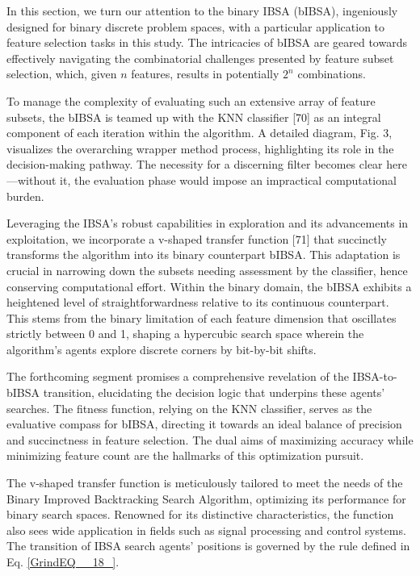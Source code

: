 \documentclass{article} %
\begin{document}
In this section, we turn our attention to the binary IBSA (bIBSA), ingeniously designed for binary discrete problem spaces, with a particular application to feature selection tasks in this study. The intricacies of bIBSA are geared towards effectively navigating the combinatorial challenges presented by feature subset selection, which, given $n$ features, results in potentially $2^n$ combinations.

To manage the complexity of evaluating such an extensive array of feature subsets, the bIBSA is teamed up with the KNN classifier [70] as an integral component of each iteration within the algorithm. A detailed diagram, Fig. 3, visualizes the overarching wrapper method process, highlighting its role in the decision-making pathway. The necessity for a discerning filter becomes clear here---without it, the evaluation phase would impose an impractical computational burden.

Leveraging the IBSA's robust capabilities in exploration and its advancements in exploitation, we incorporate a v-shaped transfer function [71] that succinctly transforms the algorithm into its binary counterpart bIBSA. This adaptation is crucial in narrowing down the subsets needing assessment by the classifier, hence conserving computational effort. Within the binary domain, the bIBSA exhibits a heightened level of straightforwardness relative to its continuous counterpart. This stems from the binary limitation of each feature dimension that oscillates strictly between 0 and 1, shaping a hypercubic search space wherein the algorithm's agents explore discrete corners by bit-by-bit shifts.

The forthcoming segment promises a comprehensive revelation of the IBSA-to-bIBSA transition, elucidating the decision logic that underpins these agents' searches. The fitness function, relying on the KNN classifier, serves as the evaluative compass for bIBSA, directing it towards an ideal balance of precision and succinctness in feature selection. The dual aims of maximizing accuracy while minimizing feature count are the hallmarks of this optimization pursuit.

The v-shaped transfer function is meticulously tailored to meet the needs of the Binary Improved Backtracking Search Algorithm, optimizing its performance for binary search spaces. Renowned for its distinctive characteristics, the function also sees wide application in fields such as signal processing and control systems. The transition of IBSA search agents' positions is governed by the rule defined in Eq. \eqref{GrindEQ__18_}.
\end{document}
